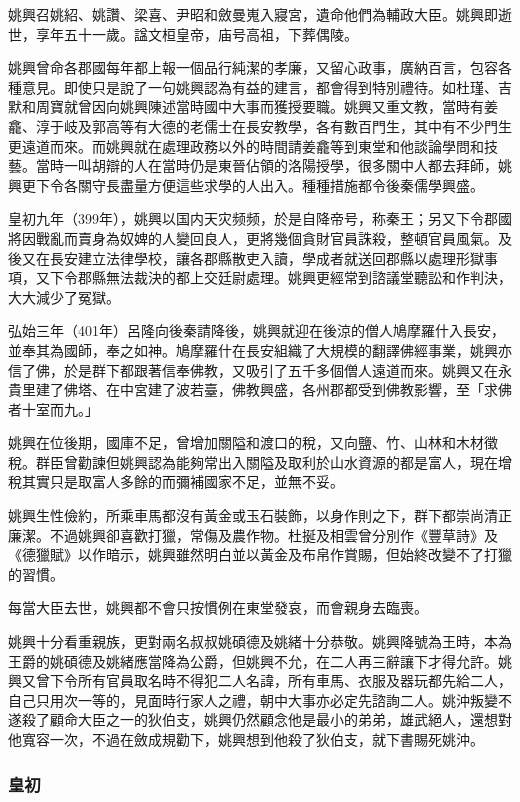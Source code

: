 姚興召姚紹、姚讚、梁喜、尹昭和斂曼嵬入寢宮，遺命他們為輔政大臣。姚興即逝世，享年五十一歲。諡文桓皇帝，庙号高祖，下葬偶陵。

姚興曾命各郡國每年都上報一個品行純潔的孝廉，又留心政事，廣納百言，包容各種意見。即使只是說了一句姚興認為有益的建言，都會得到特別禮待。如杜瑾、吉默和周寶就曾因向姚興陳述當時國中大事而獲授要職。姚興又重文教，當時有姜龕、淳于岐及郭高等有大德的老儒士在長安教學，各有數百門生，其中有不少門生更遠道而來。而姚興就在處理政務以外的時間請姜龕等到東堂和他談論學問和技藝。當時一叫胡辯的人在當時仍是東晉佔領的洛陽授學，很多關中人都去拜師，姚興更下令各關守長盡量方便這些求學的人出入。種種措施都令後秦儒學興盛。

皇初九年（399年），姚興以国内天灾频频，於是自降帝号，称秦王；另又下令郡國將因戰亂而賣身為奴婢的人變回良人，更將幾個貪財官員誅殺，整頓官員風氣。及後又在長安建立法律學校，讓各郡縣散吏入讀，學成者就送回郡縣以處理形獄事項，又下令郡縣無法裁決的都上交廷尉處理。姚興更經常到諮議堂聽訟和作判決，大大減少了冤獄。

弘始三年（401年）呂隆向後秦請降後，姚興就迎在後涼的僧人鳩摩羅什入長安，並奉其為國師，奉之如神。鳩摩羅什在長安組織了大規模的翻譯佛經事業，姚興亦信了佛，於是群下都跟著信奉佛教，又吸引了五千多個僧人遠道而來。姚興又在永貴里建了佛塔、在中宮建了波若臺，佛教興盛，各州郡都受到佛教影響，至「求佛者十室而九。」

姚興在位後期，國庫不足，曾增加關隘和渡口的稅，又向鹽、竹、山林和木材徵稅。群臣曾勸諫但姚興認為能夠常出入關隘及取利於山水資源的都是富人，現在增稅其實只是取富人多餘的而彌補國家不足，並無不妥。

姚興生性儉約，所乘車馬都沒有黃金或玉石裝飾，以身作則之下，群下都崇尚清正廉潔。不過姚興卻喜歡打獵，常傷及農作物。杜挻及相雲曾分別作《豐草詩》及《德獵賦》以作暗示，姚興雖然明白並以黃金及布帛作賞賜，但始終改變不了打獵的習慣。

每當大臣去世，姚興都不會只按慣例在東堂發哀，而會親身去臨喪。

姚興十分看重親族，更對兩名叔叔姚碩德及姚緒十分恭敬。姚興降號為王時，本為王爵的姚碩德及姚緒應當降為公爵，但姚興不允，在二人再三辭讓下才得允許。姚興又曾下令所有官員取名時不得犯二人名諱，所有車馬、衣服及器玩都先給二人，自己只用次一等的，見面時行家人之禮，朝中大事亦必定先諮詢二人。姚沖叛變不遂殺了顧命大臣之一的狄伯支，姚興仍然顧念他是最小的弟弟，雄武絕人，還想對他寬容一次，不過在斂成規勸下，姚興想到他殺了狄伯支，就下書賜死姚沖。

\subsubsection{皇初}

